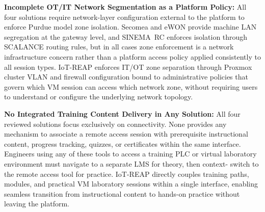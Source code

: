 \textbf{Incomplete OT/IT Network Segmentation as a Platform Policy:}
All four solutions require network-layer configuration external to the platform
to enforce Purdue model zone isolation. Secomea and eWON provide machine LAN
segregation at the gateway level, and SINEMA~RC enforces isolation through
SCALANCE routing rules, but in all cases zone enforcement is a network
infrastructure concern rather than a platform access policy applied
consistently to all session types. IoT-REAP enforces IT/OT zone separation
through Proxmox cluster VLAN and firewall configuration bound to administrative
policies that govern which VM session can access which network zone, without
requiring users to understand or configure the underlying network topology.


\textbf{No Integrated Training Content Delivery in Any Solution:}
All four reviewed solutions focus exclusively on connectivity. None provides
any mechanism to associate a remote access session with prerequisite instructional
content, progress tracking, quizzes, or certificates within the same interface.
Engineers using any of these tools to access a training PLC or virtual
laboratory environment must navigate to a separate LMS for theory, then context-
switch to the remote access tool for practice. IoT-REAP directly couples
training paths, modules, and practical VM laboratory sessions within a single
interface, enabling seamless transition from instructional content to hands-on
practice without leaving the platform.

